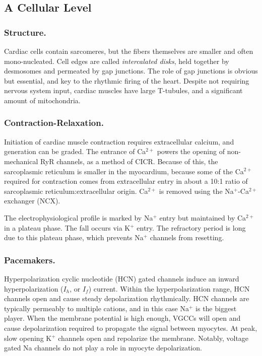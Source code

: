 \subsection{A Cellular Level}

\subsubsection{Structure.}
Cardiac cells contain sarcomeres, but the fibers themselves are smaller and often mono-nucleated. Cell edges are called \textit{intercalated disks}, held together by desmosomes and permeated by gap junctions. The role of gap junctions is obvious but essential, and key to the rhythmic firing of the heart. Despite not requiring nervous system input, cardiac muscles have large T-tubules, and a significant amount of mitochondria. 

\subsubsection{Contraction-Relaxation.} 

Initiation of cardiac muscle contraction requires extracellular calcium, and generation can be graded. The entrance of Ca$^{2+}$ powers the opening of non-mechanical RyR channels, as a method of CICR. Because of this, the sarcoplasmic reticulum is smaller in the myocardium, because some of the Ca$^{2+}$ required for contraction comes from extracellular entry in about a 10:1 ratio of sarcoplasmic reticulum:extracellular origin. Ca$^{2+}$ is removed using the Na$^+$-Ca$^{2+}$ exchanger (NCX).\newline

The electrophysiological profile is marked by Na$^+$ entry but maintained by Ca$^{2+}$ in a plateau phase. The fall occurs via K$^+$ entry. The refractory period is long due to this plateau phase, which prevents Na$^+$ channels from resetting. 

\subsubsection{Pacemakers.}
Hyperpolarization cyclic nucleotide (HCN) gated channels induce an inward hyperpolarization ($I_h$, or $I_f$) current. Within the hyperpolarization range, HCN channels open and cause steady depolarization rhythmically. HCN channels are typically permeably to multiple cations, and in this case Na$^+$ is the biggest player. When the membrane potential is high enough, VGCCs will open and cause depolarization required to propagate the signal between myocytes. At peak, slow opening K$^+$ channels open and repolarize the membrane. Notably, voltage gated Na channels do not play a role in myocyte depolarization. \newline


